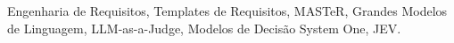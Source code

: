 \documentclass[conference]{IEEEtran}
\begin{document}
\begin{IEEEkeywords}
Engenharia de Requisitos, Templates de Requisitos, MASTeR, Grandes Modelos de Linguagem, LLM-as-a-Judge, Modelos de Decisão System One, JEV.
\end{IEEEkeywords}










\end{document}
